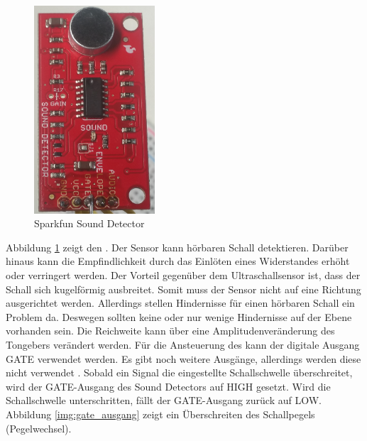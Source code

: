 \begin{figure}[H]
        \centering
        \includegraphics[width=0.4\textwidth]{images/sounddetector.png}
        \caption{Sparkfun Sound Detector}
        \label{img:sound}
\end{figure}
Abbildung \ref{img:sound} zeigt den \microphone. Der Sensor kann hörbaren Schall detektieren. Darüber hinaus kann die Empfindlichkeit durch das Einlöten eines Widerstandes erhöht oder verringert werden. Der Vorteil gegenüber dem Ultraschallsensor ist, dass der Schall sich kugelförmig ausbreitet. Somit muss der Sensor nicht auf eine Richtung ausgerichtet werden. Allerdings stellen Hindernisse für einen hörbaren Schall ein Problem da. Deswegen sollten keine oder nur wenige Hindernisse auf der Ebene vorhanden sein. Die Reichweite kann über eine Amplitudenveränderung des Tongebers verändert werden. Für die Ansteuerung des \microphone \platz kann der digitale Ausgang \si{GATE} verwendet werden. Es gibt noch weitere Ausgänge, allerdings werden diese nicht verwendet \cite{src_SOUND_DETECTOR}. Sobald ein Signal die eingestellte Schallschwelle überschreitet, wird der \si{GATE}-Ausgang des Sound Detectors auf \si{HIGH} gesetzt. Wird die Schallschwelle unterschritten, fällt der \si{GATE}-Ausgang zurück auf \si{LOW}. Abbildung \ref{img:gate_ausgang} zeigt ein Überschreiten des Schallpegels (Pegelwechsel).
 
